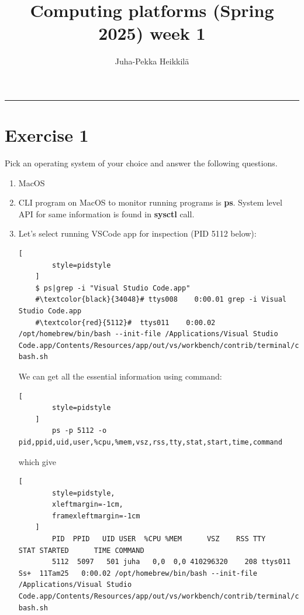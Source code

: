 \documentclass{article}
\title{Computing platforms (Spring 2025)\newline
week 1}
\author{Juha-Pekka Heikkilä}
\renewcommand{\maketitle}{%
  \begin{leftmark}
    \vspace*{\baselineskip} %



    \textbf{\fontsize{18}{36}\selectfont \thetitle} %

     \vspace{0.05cm} %
    \vspace{\baselineskip} %
     \rule{\textwidth}{0.4pt} %

   \end{leftmark}
}
\newcommand{\exercise}[1]{
    \section*{Exercise #1}
    \markboth{Exercise #1}{}
}
\begin{document}
\maketitle


\exercise{1}
Pick an operating system of your choice and answer the following questions.
\begin{enumerate}[label=\textbf{\alph*})]
    \item MacOS
    \item   CLI program on MacOS to monitor running programs is {\bf ps}.
    System level API for same information is found in {\bf sysctl} call.
    \item Let's select running VSCode app for inspection (PID 5112 below):

    \begin{lstlisting}[
        style=pidstyle
    ]
    $ ps|grep -i "Visual Studio Code.app"
    #\textcolor{black}{34048}# ttys008    0:00.01 grep -i Visual Studio Code.app
    #\textcolor{red}{5112}#  ttys011    0:00.02 /opt/homebrew/bin/bash --init-file /Applications/Visual Studio Code.app/Contents/Resources/app/out/vs/workbench/contrib/terminal/common/scripts/shellIntegration-bash.sh
    \end{lstlisting}

    We can get all the essential information using command:
    \begin{lstlisting}[
        style=pidstyle
    ]
        ps -p 5112 -o pid,ppid,uid,user,%cpu,%mem,vsz,rss,tty,stat,start,time,command
    \end{lstlisting}
    which give
    \begin{lstlisting}[
        style=pidstyle,
        xleftmargin=-1cm,
        framexleftmargin=-1cm
    ]
        PID  PPID   UID USER  %CPU %MEM      VSZ    RSS TTY      STAT STARTED      TIME COMMAND
        5112  5097   501 juha   0,0  0,0 410296320    208 ttys011  Ss+  11Tam25   0:00.02 /opt/homebrew/bin/bash --init-file /Applications/Visual Studio Code.app/Contents/Resources/app/out/vs/workbench/contrib/terminal/common/scripts/shellIntegration-bash.sh
    \end{lstlisting}


\end{enumerate}
\end{document}
